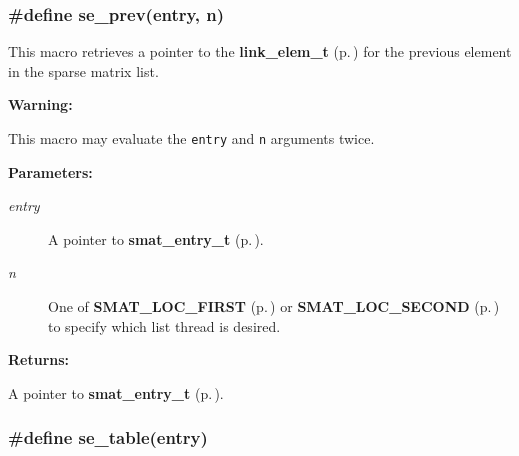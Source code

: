 \subsubsection{\setlength{\rightskip}{0pt plus 5cm}\#define se\_\-prev(entry, n)}\label{group__dbprim__smat_a45}




 This macro retrieves a pointer to the {\bf link\_\-elem\_\-t} {\rm (p.\,\pageref{group__dbprim__link_a1})} for the previous element in the sparse matrix list.

\begin{Desc}
\item[{\bf Warning: }]\par
This macro may evaluate the {\tt entry} and {\tt n} arguments twice.\end{Desc}
\begin{Desc}
\item[{\bf Parameters: }]\par
\begin{description}
\item[
{\em entry}]A pointer to {\bf smat\_\-entry\_\-t} {\rm (p.\,\pageref{group__dbprim__smat_a2})}. \item[
{\em n}]One of {\bf SMAT\_\-LOC\_\-FIRST} {\rm (p.\,\pageref{group__dbprim__smat_a48a102})} or {\bf SMAT\_\-LOC\_\-SECOND} {\rm (p.\,\pageref{group__dbprim__smat_a48a103})} to specify which list thread is desired.

\end{description}
\end{Desc}
\begin{Desc}
\item[{\bf Returns: }]\par
A pointer to {\bf smat\_\-entry\_\-t} {\rm (p.\,\pageref{group__dbprim__smat_a2})}. \end{Desc}
\subsubsection{\setlength{\rightskip}{0pt plus 5cm}\#define se\_\-table(entry)}\label{group__dbprim__smat_a40}




